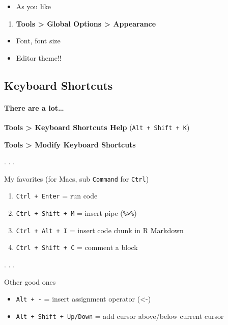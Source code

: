 \documentclass[
  letterpaper,
  DIV=11,
  numbers=noendperiod,
  oneside]{scrartcl}
\let\oldparagraph\paragraph
\renewcommand{\paragraph}[1]{\oldparagraph{#1}\mbox{}}
\providecommand{\tightlist}{%
  \setlength{\itemsep}{0pt}\setlength{\parskip}{0pt}}\usepackage{longtable,booktabs,array}
\begin{document}
\begin{itemize}
\tightlist
\item
  As you like
\end{itemize}

\begin{enumerate}
\def\labelenumi{\arabic{enumi}.}
\setcounter{enumi}{3}
\tightlist
\item
  \textbf{Tools \textgreater{} Global Options \textgreater{} Appearance}
\end{enumerate}

\begin{itemize}
\tightlist
\item
  Font, font size
\item
  Editor theme!!
\end{itemize}

\hypertarget{keyboard-shortcuts}{%
\subsection{Keyboard Shortcuts}\label{keyboard-shortcuts}}

\hypertarget{there-are-a-lot}{%
\paragraph{There are a lot\ldots{}}\label{there-are-a-lot}}

\textbf{Tools \textgreater{} Keyboard Shortcuts Help}
(\texttt{Alt\ +\ Shift\ +\ K})

\textbf{Tools \textgreater{} Modify Keyboard Shortcuts}

. . .

My favorites (for Macs, sub \texttt{Command} for \texttt{Ctrl})

\begin{enumerate}
\def\labelenumi{\arabic{enumi}.}
\tightlist
\item
  \texttt{Ctrl\ +\ Enter} = run code
\item
  \texttt{Ctrl\ +\ Shift\ +\ M} = insert pipe
  (\texttt{\%\textgreater{}\%})
\item
  \texttt{Ctrl\ +\ Alt\ +\ I} = insert code chunk in R Markdown
\item
  \texttt{Ctrl\ +\ Shift\ +\ C} = comment a block
\end{enumerate}

. . .

Other good ones

\begin{itemize}
\tightlist
\item
  \texttt{Alt\ +\ -} = insert assignment operator (\textless-)
\item
  \texttt{Alt\ +\ Shift\ +\ Up/Down} = add cursor above/below current
  cursor
\end{itemize}
\end{document}
